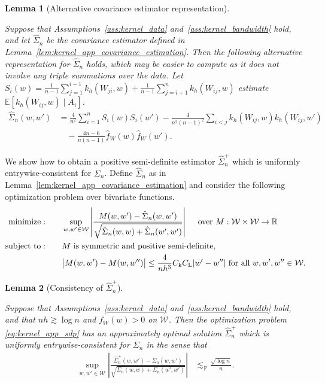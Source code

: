 \documentclass[11pt,lof]{puthesis}
\renewcommand{\P}{\ensuremath{\mathbb{P}}}
\newcommand{\R}{\ensuremath{\mathbb{R}}}
\newcommand{\E}{\ensuremath{\mathbb{E}}}
\newcommand{\rL}{\ensuremath{\mathrm{L}}}
\newcommand{\rk}{\ensuremath{\mathrm{k}}}
\newcommand{\cW}{\ensuremath{\mathcal{W}}}
\DeclareMathOperator*{\minimize}{minimize:}
\DeclareMathOperator*{\subjectto}{subject\ to:}
\theoremstyle{break}
\newtheorem{lemma}{Lemma}[section]
\theoremstyle{proof}
\begin{document}
\begin{lemma}[Alternative covariance estimator representation]
\label{lem:kernel_app_alternative_covariance_estimator}

Suppose that Assumptions~\ref{ass:kernel_data}
and~\ref{ass:kernel_bandwidth} hold,
and let $\hat \Sigma_n$
be the covariance estimator defined
in Lemma~\ref{lem:kernel_app_covariance_estimation}.
Then the following alternative representation
for $\hat \Sigma_n$ holds,
which may be easier to compute
as it does not involve any triple summations
over the data.
Let $S_i(w) = \frac{1}{n-1}
\sum_{j = 1}^{i-1} k_h(W_{j i}, w)
+ \frac{1}{n-1} \sum_{j = i+1}^n k_h(W_{i j}, w)$
estimate $\E[k_h(W_{i j},w) \mid A_i]$.
%
\begin{align*}
\hat \Sigma_n(w,w')
&=
\frac{4}{n^2}
\sum_{i=1}^n
S_i(w) S_i(w')
- \frac{4}{n^2(n-1)^2}
\sum_{i<j}
k_h(W_{i j},w)
k_h(W_{i j},w') \\
&\quad-
\frac{4n-6}{n(n-1)}
\hat f_W(w)
\hat f_W(w').
\end{align*}
%
\end{lemma}

We show how to obtain a positive semi-definite estimator $\hat \Sigma_n^+$
which is uniformly entrywise-consistent for $\Sigma_n$. Define $\hat \Sigma_n$
as in Lemma~\ref{lem:kernel_app_covariance_estimation} and consider the
following
optimization problem over bivariate functions.
%
\begin{equation}
\label{eq:kernel_app_sdp}
%
\begin{aligned}
\minimize
\qquad
& \sup_{w,w' \in \cW}
\left|
\frac{M(w,w') - \hat\Sigma_n(w,w')}
{\sqrt{\hat \Sigma_n(w,w) + \hat \Sigma_n(w',w')}}
\right|
\quad \textup{ over } M: \cW \times \cW \to \R
\\
\subjectto
\qquad
& M \textup{ is symmetric and positive semi-definite}, \\
& \big|M(w,w') - M(w, w'')\big|
\leq \frac{4}{n h^3}
C_\rk C_\rL
|w'-w''|
\textup{ for all }
w, w', w'' \in \cW.
\end{aligned}
%
\end{equation}

\begin{lemma}[Consistency of $\hat \Sigma_n^+$]
\label{lem:kernel_app_sdp}

Suppose that Assumptions~\ref{ass:kernel_data}
and~\ref{ass:kernel_bandwidth} hold, and that
$n h \gtrsim \log n$ and $f_W(w) > 0$ on $\cW$.
Then the optimization problem \eqref{eq:kernel_app_sdp}
has an approximately optimal solution $\hat\Sigma_n^+$
which is uniformly entrywise-consistent
for $\Sigma_n$ in the sense that
%
\begin{align*}
\sup_{w,w' \in \cW}
\left|
\frac{\hat \Sigma_n^+(w,w') - \Sigma_n(w,w')}
{\sqrt{\Sigma_n(w,w) + \Sigma_n(w',w')}}
\right|
&\lesssim_\P
\frac{\sqrt{\log n}}{n}.
\end{align*}

\end{lemma}
\end{document}
